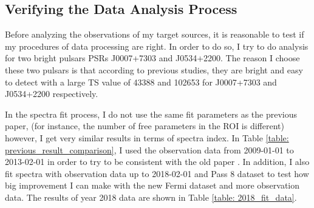 \documentclass[12pt]{report}
\begin{document}
        \subsection{Verifying the Data Analysis Process}
          Before analyzing the observations of my target sources, it is reasonable to test if my procedures of 
          data processing are right. In order to do so, I try to do analysis for 
          two bright pulsars PSRs J0007+7303 and J0534+2200. The reason I choose these two pulsars 
          is that according to previous studies, they are bright and easy to detect with a large TS value of 
          43388 and 102653 for J0007+7303 and J0534+2200 respectively. \cite{0067-0049-208-2-17} 

          In the spectra fit process, I do not use the same fit parameters as the previous paper, 
          (for instance, the number of free parameters in the ROI is different)
          however, I get very similar results in terms of spectra index.  
          In Table \ref{table: previous_result_comparison}, I used the observation data from 
          2009-01-01 to 2013-02-01 in order to try to be 
          consistent with the old paper \cite{0067-0049-208-2-17}. 
          In addition, I also fit spectra with observation data up to 2018-02-01 and Pass 8 dataset to test 
          how big improvement I can make with the new Fermi dataset and more observation data. 
          The results of year 2018 data are shown in Table \ref{table: 2018_fit_data}.
\end{document}
